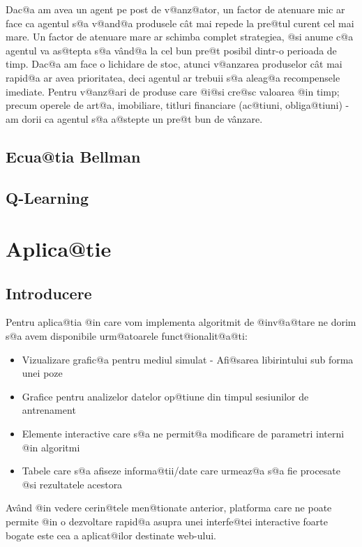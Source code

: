 Dac@a am avea un agent pe post de v@anz@ator, un factor de atenuare mic ar face ca agentul s@a v@and@a produsele c\^ at mai repede la pre@tul curent cel mai mare. Un factor de atenuare mare ar schimba complet strategiea, @si anume c@a agentul va as@tepta s@a v\^ and@a la cel bun pre@t posibil dintr-o perioada de timp. Dac@a am face o lichidare de stoc, atunci v@anzarea produselor c\^ at mai rapid@a ar avea prioritatea, deci agentul ar trebuii s@a aleag@a recompensele imediate. Pentru v@anz@ari de produse care @i@si cre@sc valoarea @in timp; precum operele de art@a, imobiliare, titluri financiare (ac@tiuni, obliga@tiuni) - am dorii ca agentul s@a a@stepte un pre@t bun de v\^ anzare.

\section{Ecua@tia Bellman}



\section{Q-Learning}

\chapter{Aplica@tie}

\section{Introducere}

Pentru aplica@tia @in care vom implementa algoritmit de @inv@a@tare ne dorim s@a avem disponibile urm@atoarele funct@ionalit@a@ti:

\begin{itemize}
	\item Vizualizare grafic@a pentru mediul simulat - Afi@sarea libirintului sub forma unei poze
	\item Grafice pentru analizelor datelor op@tiune din timpul sesiunilor de antrenament
	\item Elemente interactive care s@a ne permit@a modificare de parametri interni @in algoritmi
	\item Tabele care s@a afiseze informa@tii/date care urmeaz@a s@a fie procesate @si rezultatele acestora
\end{itemize}

Av\^ and @in vedere cerin@tele men@tionate anterior, platforma care ne poate permite @in o dezvoltare rapid@a asupra unei interfe@tei interactive foarte bogate este cea a aplicat@ilor destinate web-ului.

